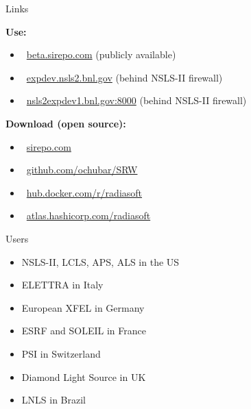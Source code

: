 \documentclass[final]{beamer}
\newlength{\onecolwid}
\newcommand{\colorify}[1]{\textcolor{linkcolor}{#1}}
\newcommand{\mylinkn}[2]{\href{#1}{\colorify{#2}}}
\begin{document}
\begin{frame}[t]
\begin{columns}[t]
\begin{column}{\onecolwid}
\begin{block}{\faLink{} Links}

\textbf{\faGears{} Use:}

\begin{itemize}
  \item[\faGear{}]~\mylinkn{https://beta.sirepo.com/light}{beta.sirepo.com} (publicly available)
  \item[\faGear{}]~\mylinkn{https://expdev.nsls2.bnl.gov/light}{expdev.nsls2.bnl.gov} (behind NSLS-II firewall)
  \item[\faGear{}]~\mylinkn{http://nsls2expdev1.bnl.gov:8000/light}{nsls2expdev1.bnl.gov:8000} (behind NSLS-II firewall)
\end{itemize}

\textbf{\faDownload{} Download (open source):}

\begin{itemize}
  \item[\faGithub{}]~\mylinkn{http://sirepo.com}{sirepo.com}
  \item[\faGithub{}]~\mylinkn{https://github.com/ochubar/SRW}{github.com/ochubar/SRW}
  \item[\faShip{}]~\mylinkn{https://hub.docker.com/r/radiasoft/sirepo/tags/}{hub.docker.com/r/radiasoft}
  \item[\faCloudDownload{}]~\mylinkn{https://atlas.hashicorp.com/radiasoft/boxes/sirepo}{atlas.hashicorp.com/radiasoft}
\end{itemize}

\end{block}

\begin{block}{\faUsers{} Users}
\begin{itemize}
  \item NSLS-II, LCLS, APS, ALS in the US
  \item ELETTRA in Italy
  \item European XFEL in Germany
  \item ESRF and SOLEIL in France
  \item PSI in Switzerland
  \item Diamond Light Source in UK
  \item LNLS in Brazil
\end{itemize}
\end{block}


\end{column} %


\end{columns}
\end{frame}
\end{document}
